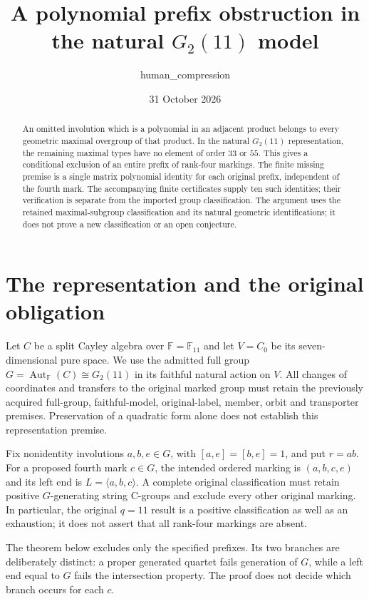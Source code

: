\documentclass[11pt]{article}
\title{A polynomial prefix obstruction in the natural $G_2(11)$ model}
\author{human\_compression}
\date{31 October 2026}
\newcommand{\F}{\mathbb F}
\newcommand{\gen}[1]{\langle #1\rangle}
\begin{document}
\maketitle

\begin{abstract}
An omitted involution which is a polynomial in an adjacent product belongs
to every geometric maximal overgroup of that product. In the natural
$G_2(11)$ representation, the remaining maximal types have no element of
order $33$ or $55$. This gives a conditional exclusion of an entire prefix
of rank-four markings. The finite missing premise is a single matrix
polynomial identity for each original prefix, independent of the fourth
mark. The accompanying finite certificates supply ten such identities; their verification is separate from the imported group classification. The argument uses
the retained maximal-subgroup classification and its natural geometric
identifications; it does not prove a new classification or an open
conjecture.
\end{abstract}

\section{The representation and the original obligation}

Let $C$ be a split Cayley algebra over $\F=\F_{11}$ and let $V=C_0$ be its
seven-dimensional pure space. We use the admitted full group
$G=\operatorname{Aut}_{\F}(C)\cong G_2(11)$ in its faithful natural action
on $V$. All changes of coordinates and transfers to the original marked
group must retain the previously acquired full-group, faithful-model,
original-label, member, orbit and transporter premises. Preservation of a
quadratic form alone does not establish this representation premise.

Fix nonidentity involutions $a,b,e\in G$, with $[a,e]=[b,e]=1$, and put
$r=ab$. For a proposed fourth mark $c\in G$, the intended ordered marking
is $(a,b,c,e)$ and its left end is $L=\gen{a,b,c}$. A complete original
classification must retain positive $G$-generating string C-groups and
exclude every other original marking. In particular, the original
$q=11$ result is a positive classification as well as an exhaustion; it
does not assert that all rank-four markings are absent.

The theorem below excludes only the specified prefixes. Its two branches
are deliberately distinct: a proper generated quartet fails generation of
$G$, while a left end equal to $G$ fails the intersection property. The
proof does not decide which branch occurs for each $c$.
\end{document}
